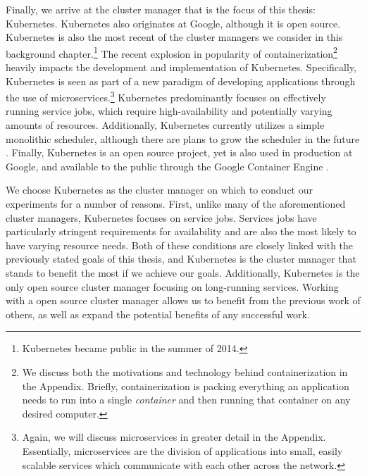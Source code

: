 Finally, we arrive at the cluster manager that is the focus of this thesis:
Kubernetes. Kubernetes also originates at Google, although it is open source.
Kubernetes is also the most
recent of the cluster managers we consider in this background chapter.\footnote{Kubernetes
became public in the summer of 2014.} The recent
explosion in popularity of containerization\footnote{We discuss both the motivations and
technology behind containerization in the Appendix. Briefly, containerization is
packing everything an application needs to run into a single \textit{container}
and then running that container on any desired computer.}
heavily impacts the development and implementation of Kubernetes. Specifically,
Kubernetes is seen as part of a new paradigm of developing applications
through the use of microservices.\footnote{Again, we will
discuss microservices in greater detail
in the Appendix. Essentially, microservices are the division of applications
into small, easily scalable services which communicate with each other across
the network.} Kubernetes predominantly focuses on effectively running service
jobs, which require high-availability and potentially varying amounts of resources.
Additionally, Kubernetes currently utilizes a simple
monolithic scheduler, although
there are plans to grow the scheduler in the future \cite{k8s-design-overview}.
Finally, Kubernetes is an open source project, yet is also used in production at
Google, and available to the public through the Google Container
Engine \cite{google-container-engine}.

We choose Kubernetes as the cluster manager on which to conduct our experiments
for a number of reasons. First, unlike many of the aforementioned cluster
managers, Kubernetes focuses on service jobs. Services jobs
have particularly stringent requirements for availability and are also the most
likely to have varying resource needs. Both of these conditions are closely linked
with the previously stated goals of this thesis, and Kubernetes is the cluster
manager that stands to benefit the most if we achieve our goals. Additionally,
Kubernetes is the only open source cluster manager focusing on long-running
services. Working with a open source cluster manager allows us to benefit from
the previous work of others, as well as expand the potential benefits of any
successful work.
